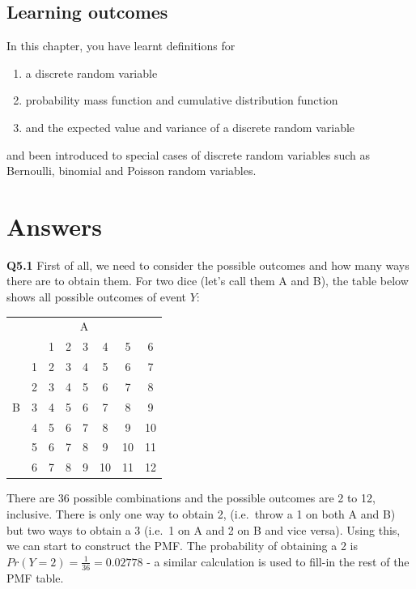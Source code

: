 \documentclass[
  oneside]{krantz}
\begin{document}
\hypertarget{learning-outcomes-2}{%
\subsection{Learning outcomes}\label{learning-outcomes-2}}

In this chapter, you have learnt definitions for

\begin{enumerate}
\def\labelenumi{\arabic{enumi}.}
\item
  a discrete random variable
\item
  probability mass function and cumulative distribution function
\item
  and the expected value and variance of a discrete random variable
\end{enumerate}

and been introduced to special cases of discrete random variables such as Bernoulli, binomial and Poisson random variables.

\hypertarget{ANSdiscrv}{%
\section{Answers}\label{ANSdiscrv}}

\textbf{Q5.1} First of all, we need to consider the possible outcomes and how many ways there are to obtain them. For two dice (let's call them A and B), the table below shows all possible outcomes of event \(Y\):

\begin{center}
\begin{tabular} {l l|c|c|c|c|c|c}
\multicolumn{8}{c}{A}\\
 & & 1 & 2 & 3 & 4 & 5 & 6 \\
\hline
  & 1 & 2 & 3 & 4 & 5 & 6 & 7\\
  & 2 & 3 & 4 & 5 & 6 & 7 & 8\\
B & 3 & 4 & 5 & 6 & 7 & 8 & 9\\
  & 4 & 5 & 6 & 7 & 8 & 9 & 10 \\
  & 5 & 6 & 7 & 8 & 9 & 10 & 11 \\
  & 6 & 7 & 8 & 9 & 10 & 11 & 12\\
\hline
\end{tabular}
\end{center}

There are 36 possible combinations and the possible outcomes are 2 to 12, inclusive. There is only one way to obtain 2, (i.e.~throw a 1 on both A and B) but two ways to obtain a 3 (i.e.~1 on A and 2 on B and vice versa). Using this, we can start to construct the PMF. The probability of obtaining a 2 is \(Pr(Y=2) = \frac{1}{36} = 0.02778\) - a similar calculation is used to fill-in the rest of the PMF table.
\end{document}

